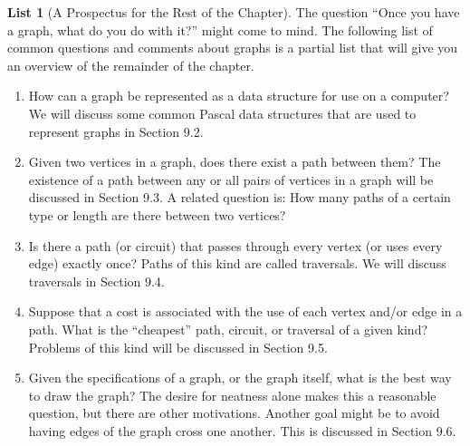 \documentclass[10pt,]{book}
\theoremstyle{plain}
\theoremstyle{definition}
\theoremstyle{definition}
\theoremstyle{definition}
\theoremstyle{definition}
\theoremstyle{definition}
\newtheorem{listwrapper}[theorem]{List}
\numberwithin{equation}{section}
\begin{document}
\begin{listwrapper}[A Prospectus for the Rest of the Chapter]\label{list-graph-prospectus}
\typeout{************************************************}
\typeout{************************************************}
The question ``Once you have a graph, what do you do with it?'' might come to mind. The following list of common questions and comments about
graphs is a partial list that will give you an overview of the remainder of the chapter.%
\leavevmode%
\begin{enumerate}[label=\arabic*]
\item\hypertarget{li-8}{}How can a graph be represented as a data structure for use on a computer? We will discuss some common Pascal data structures that are
used to represent graphs in Section 9.2.%
\item\hypertarget{li-9}{}Given two vertices in a graph, does there exist a path between them? The existence of a path between any or all pairs
of vertices in a graph will be discussed in Section 9.3. A related question is: How many paths of a certain type or length are there between two
vertices?%
\item\hypertarget{li-10}{} Is there a path (or circuit) that passes through every vertex (or uses every edge) exactly once? Paths of this kind are called traversals.
We will discuss traversals in Section 9.4.%
\item\hypertarget{li-11}{}Suppose that a cost is associated with the use of each vertex and/or edge in a path. What is the ``cheapest'' path, circuit, or traversal
of a given kind? Problems of this kind will be discussed in Section 9.5.%
\item\hypertarget{li-12}{}Given the specifications of a graph, or the graph itself, what is the best way to draw the graph? The desire for neatness alone makes this
a reasonable question, but there are other motivations. Another goal might be to avoid having edges of the graph cross one another. This is discussed in Section 9.6.%
\end{enumerate}
\end{listwrapper}
\typeout{************************************************}
\typeout{************************************************}
\end{document}
